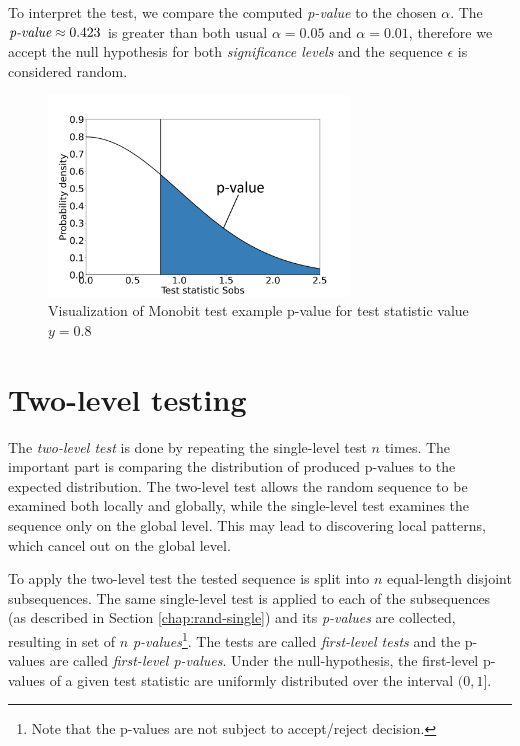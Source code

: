 \documentclass[
  digital,     %
  oneside,     %
  nosansbold,  %
  nocolorbold, %
  nolof,         %
  nolot,         %
]{fithesis4}
\begin{document}
To interpret the test, we compare the computed \emph{p-value} to the chosen $\alpha$. The $\emph{p-value} \approx 0.423$ is greater than both usual $\alpha = 0.05$ and $\alpha = 0.01$, therefore we accept the null hypothesis for both \emph{significance levels} and the sequence $\epsilon$ is considered random.

\begin{figure}
  \begin{center}
    \includegraphics[width=8cm]{figures/test_example.png}
  \end{center}
  \caption{Visualization of Monobit test example p-value for test statistic value $y = 0.8$}
  \label{fig:example}
\end{figure}

\section{Two-level testing} \label{chap:rand-two_level}

The \emph{two-level test} is done by repeating the single-level test $n$ times. The important part is comparing the distribution of produced p-values to the expected distribution. The two-level test allows the random sequence to be examined both locally and globally, while the single-level test examines the sequence only on the global level. This may lead to discovering local patterns, which cancel out on the global level. \cite[p. 7]{tu01_paper}

To apply the two-level test the tested sequence is split into $n$ equal-length disjoint subsequences. The same single-level test is applied to each of the subsequences (as described in Section \ref{chap:rand-single}) and its \emph{p-values} are collected, resulting in set of $n$ \emph{p-values}\footnote{Note that the p-values are not subject to accept/reject decision.}. The tests are called \emph{first-level tests} and the p-values are called \emph{first-level p-values}. Under the null-hypothesis, the first-level p-values of a given test statistic are uniformly distributed over the interval $(0,1]$. \cite[p. 14]{bad_day} 
\end{document}
